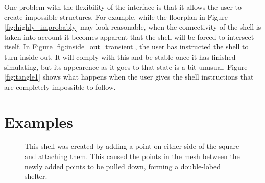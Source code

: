 \documentclass{thesis}
\begin{document}
One problem with the flexibility of the interface is that it allows the user to create impossible structures.  For example,
while the floorplan in Figure \ref{fig:highly_improbably} may look reasonable, when the connectivity of the shell is taken into
account it becomes apparent that the shell will be forced to intersect itself.  In Figure \ref{fig:inside_out_transient}, the
user has instructed the shell to turn inside out.  It will comply with this and be stable once it has finished simulating, but
its appearence as it goes to that state is a bit unusual.  Figure \ref{fig:tangle1} shows what happens when the user gives the
shell instructions that are completely impossible to follow.

\section{Examples}

\begin{figure}
\caption[Adding points]{This shell was created by adding a point on either side of the square and attaching them.  This
caused the points in the mesh between the newly added points to be pulled down, forming a double-lobed shelter.}
\label{fig:waist}
\end{figure}
\end{document}
